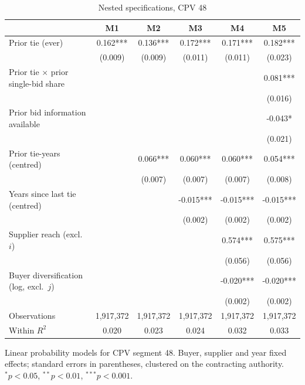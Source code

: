 \begin{table}[htbp]
\centering
\begin{threeparttable}
\caption{Nested specifications, CPV 48}
\label{tab:panel-nested-48}
\begin{tabular}{lccccc}
\toprule
 & M1 & M2 & M3 & M4 & M5 \\
\midrule
Prior tie (ever) & 0.162*** & 0.136*** & 0.172*** & 0.171*** & 0.182*** \\
 & (0.009) & (0.009) & (0.011) & (0.011) & (0.023) \\
Prior tie $\times$ prior single-bid share &  &  &  &  & 0.081*** \\
 &  &  &  &  & (0.016) \\
Prior bid information available &  &  &  &  & -0.043* \\
 &  &  &  &  & (0.021) \\
Prior tie-years (centred) &  & 0.066*** & 0.060*** & 0.060*** & 0.054*** \\
 &  & (0.007) & (0.007) & (0.007) & (0.008) \\
Years since last tie (centred) &  &  & -0.015*** & -0.015*** & -0.015*** \\
 &  &  & (0.002) & (0.002) & (0.002) \\
Supplier reach (excl.\ $i$) &  &  &  & 0.574*** & 0.575*** \\
 &  &  &  & (0.056) & (0.056) \\
Buyer diversification (log, excl.\ $j$) &  &  &  & -0.020*** & -0.020*** \\
 &  &  &  & (0.002) & (0.002) \\
\midrule
Observations & 1,917,372 & 1,917,372 & 1,917,372 & 1,917,372 & 1,917,372 \\
Within $R^2$ & 0.020 & 0.023 & 0.024 & 0.032 & 0.033 \\
\bottomrule
\end{tabular}
\begin{tablenotes}\small\item Linear probability models for CPV segment 48. Buyer, supplier and year fixed effects; standard errors in parentheses, clustered on the contracting authority. $^{*}p<0.05$, $^{**}p<0.01$, $^{***}p<0.001$.\end{tablenotes}
\end{threeparttable}
\end{table}